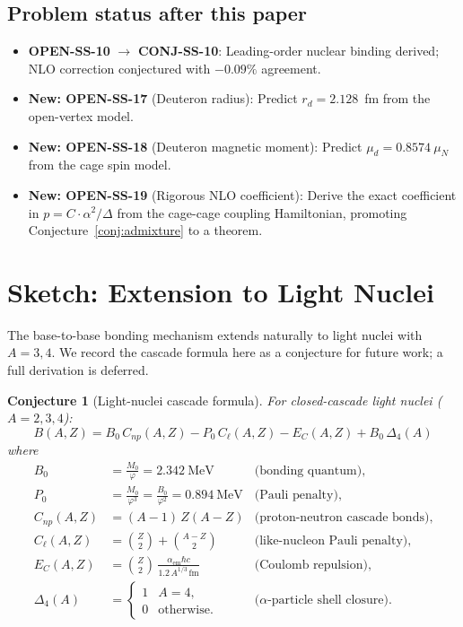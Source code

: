 \documentclass[11pt,letterpaper]{article}
\newtheorem{conjecture}[theorem]{Conjecture}
\newcommand{\phig}{\varphi}
\newcommand{\Mzero}{M_0}
\begin{document}
\subsection{Problem status after this paper}

\begin{itemize}
\item \textbf{OPEN-SS-10} $\to$ \textbf{CONJ-SS-10}:
Leading-order nuclear binding derived; NLO correction
conjectured with $-0.09\%$ agreement.
\item \textbf{New: OPEN-SS-17} (Deuteron radius):
Predict $r_d = 2.128$~fm from the open-vertex model.
\item \textbf{New: OPEN-SS-18} (Deuteron magnetic moment):
Predict $\mu_d = 0.8574~\mu_N$ from the cage spin model.
\item \textbf{New: OPEN-SS-19} (Rigorous NLO coefficient):
Derive the exact coefficient in
$p = C \cdot \alpha^2/\Delta$ from the cage-cage
coupling Hamiltonian, promoting
Conjecture~\ref{conj:admixture} to a theorem.
\end{itemize}

\section{Sketch: Extension to Light Nuclei}
\label{sec:lightnuclei}

The base-to-base bonding mechanism extends naturally to
light nuclei with $A = 3, 4$.  We record the cascade
formula here as a conjecture for future work; a full
derivation is deferred.

\begin{conjecture}[Light-nuclei cascade formula]
\label{conj:lightnuclei}
For closed-cascade light nuclei ($A = 2, 3, 4$):
\begin{equation}
\boxed{
B(A,Z) = B_0\, C_{np}(A,Z) - P_0\, C_\ell(A,Z)
- E_C(A,Z) + B_0\, \Delta_4(A)
}
\label{eq:lightnuclei}
\end{equation}
where
\begin{align}
B_0 &= \frac{\Mzero}{\phig} = 2.342~\text{MeV}
& \text{(bonding quantum)},
\\
P_0 &= \frac{\Mzero}{\phig^3} = \frac{B_0}{\phig^2}
= 0.894~\text{MeV}
& \text{(Pauli penalty)},
\\
C_{np}(A,Z) &= (A-1)\,Z(A-Z)
& \text{(proton-neutron cascade bonds)},
\\
C_\ell(A,Z) &= \binom{Z}{2} + \binom{A-Z}{2}
& \text{(like-nucleon Pauli penalty)},
\\
E_C(A,Z) &= \binom{Z}{2}\,
\frac{\alpha_{\mathrm{em}}\hbar c}{1.2\, A^{1/3}\,\text{fm}}
& \text{(Coulomb repulsion)},
\\
\Delta_4(A) &= \begin{cases}
1 & A = 4, \\
0 & \text{otherwise}.
\end{cases}
& \text{($\alpha$-particle shell closure)}.
\end{align}
\end{conjecture}
\end{document}
